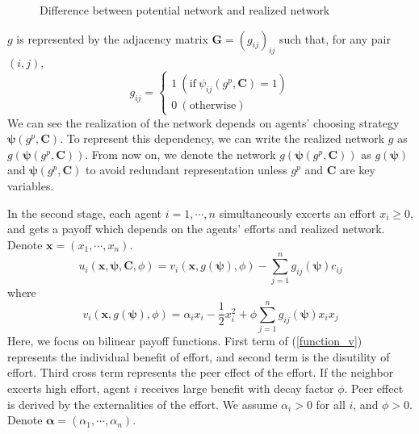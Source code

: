 \documentclass[12pt]{article}
\theoremstyle{definition}
\newcommand{\bm}[1]{\boldsymbol{#1}}
\begin{document}
\begin{figure}[h]
\caption{Difference between potential network and realized network} \label{fig:dif}
\end{figure}

$g$ is represented by the adjacency matrix $\bm{G} = {(g_{ij})}_{ij}$ such that, for any pair $(i,j)$,
\[ g_{ij} = 
	\begin{cases}
		1 \  (\text{if} \  \psi_{ij}(g^p, {\bm{C}}) = 1 ) \\
		0 \  (\text{otherwise})
	\end{cases} \]
We can see the realization of the network depends on agents' choosing strategy $\bm{\psi}(g^p, \bm{C})$.
To represent this dependency, we can write the realized network $g$ as $g(\bm{\psi}(g^p, \bm{C}))$.
From now on, we denote the network $g(\bm{\psi}(g^p, \bm{C}))$ as $g(\bm{\psi})$ and $\bm{\psi}(g^p, \bm{C})$ to avoid redundant representation unless $g^p$ and $\bm{C}$ are key variables.

In the second stage, each agent $i = 1, \cdots, n$ simultaneously excerts an effort $x_i \ge 0$, and gets a payoff which depends on the agents' efforts and realized network.
Denote $\bm{x} = (x_1, \cdots, x_n)$.
\[ u_i(\bm{x}, \bm{\psi}, \bm{C}, \phi) = v_i(\bm{x}, g(\bm{\psi}), \phi) - \sum_{j=1}^n g_{ij}(\bm{\psi}) c_{ij} \]
where
\begin{equation}
\label{function_v}
	v_i(\bm{x}, g(\bm{\psi}), \phi) = \alpha_i x_i - \frac{1}{2} x_i^2 + \phi \sum_{j=1}^n g_{ij}(\bm{\psi}) x_i x_j
\end{equation}
Here, we focus on bilinear payoff functions.
First term of (\ref{function_v}) represents the individual benefit of effort, and second term is the disutility of effort.
Third cross term represents the peer effect of the effort.
If the neighbor excerts high effort, agent $i$ receives large benefit with decay factor $\phi$.
Peer effect is derived by the externalities of the effort.
We assume $\alpha_i > 0$ for all $i$, and $\phi > 0$.
Denote $\bm{\alpha} = (\alpha_1, \cdots, \alpha_n)$.
\end{document}
